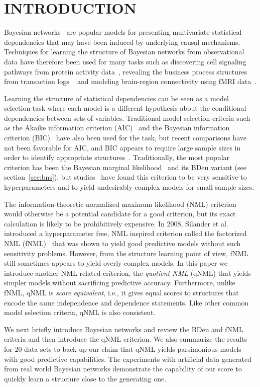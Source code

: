 \section{INTRODUCTION}
\label{sec:intro}
Bayesian networks~\cite{Pear88} are popular models for presenting
multivariate statistical dependencies that may have been induced by
underlying causal mechanisms.  Techniques for learning the structure
of Bayesian networks from observational data have therefore been used
for many tasks such as discovering cell signaling pathways from
protein activity data~\cite{bn4sigpath02}, revealing the business
process structures from transaction logs ~\cite{bn4bpmining} and
modeling brain-region connectivity using fMRI
data~\cite{bn4brainconnect}.

Learning the structure of statistical dependencies can be seen as a
model selection task where each model is a different hypothesis about
the conditional dependencies between sets of variables. Traditional
model selection criteria such as the Akaike information criterion
(AIC)~\cite{Akai73} and the Bayesian information criterion
(BIC)~\cite{Schw78} have also been used for the task, but recent
comparisons have not been favorable for AIC, and BIC appears to
require large sample sizes in order to identify appropriate
structures~\cite{cosco.pgm08a,Liu2012}. Traditionally, the most
popular criterion has been the Bayesian marginal
likelihood~\cite{Heck95b} and its BDeu variant (see
section~\ref{sec:bns}), but studies~\cite{cosco.uai07,Steck08} have
found this criterion to be very sensitive to hyperparameters and to
yield undesirably complex models for small sample sizes.

The information-theoretic normalized maximum likelihood (NML)
criterion~\cite{Shta87,Riss96a} would otherwise be a potential
candidate for a good criterion, but its exact calculation is likely to
be prohibitively expensive. In 2008, Silander et al. introduced a
hyperparameter free, NML inspired criterion called the factorized NML
(fNML)~\cite{cosco.pgm08a} that was shown to yield good predictive
models without such sensitivity problems. However, from the structure
learning point of view, fNML still sometimes appears to yield
overly complex models. In this paper we introduce another NML related
criterion, the \textit{quotient NML} (qNML) that yields simpler models
without sacrificing predictive accuracy. Furthermore, unlike fNML,
qNML is \textit{score equivalent}, i.e., it gives equal scores to
structures that encode the same independence and dependence
statements. Like other common model selection criteria, qNML is also
consistent.

We next briefly introduce Bayesian networks and review the BDeu and
fNML criteria and then introduce the qNML criterion.  We also
summarize the results for 20 data sets to back up our claim that qNML
yields parsimonious models with good predictive capabilities. The
experiments with artificial data generated from real world Bayesian networks demonstrate the capability of our score to quickly learn a structure close to the generating one.

